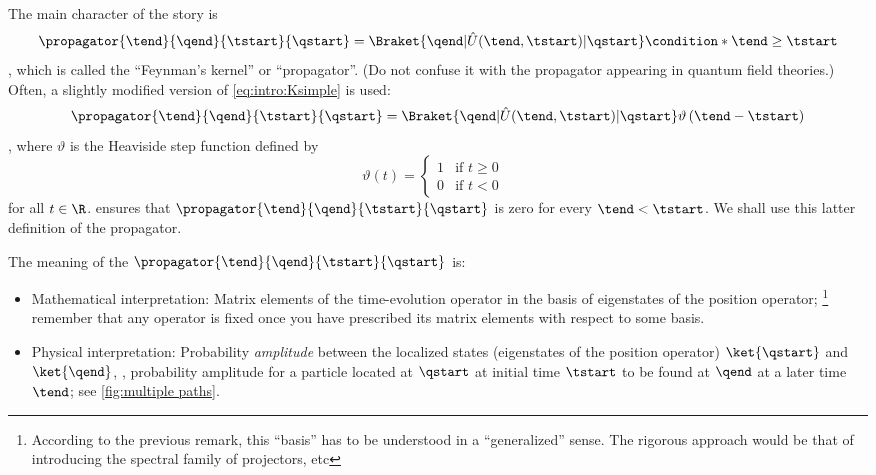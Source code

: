 The   main character of
the story is
\begin{dmath}[label={intro:Ksimple}]
   \propagator{\tend}{\qend}{\tstart}{\qstart} 
   = 
   \Braket{ \qend| \hat{U} (\tend,\tstart) | \qstart}
   \condition*{\tend \geq \tstart}
\end{dmath},
which is called the ``Feynman's kernel'' or ``propagator''. (Do not confuse it
with the propagator appearing in quantum field theories.)
Often, a slightly modified version of \cref{eq:intro:Ksimple} is used:
\begin{dmath}[label={intro:K}]
   \propagator{\tend}{\qend}{\tstart}{\qstart} 
   = 
   \Braket{ \qend| \hat{U} (\tend,\tstart) | \qstart}
   \vartheta\left( \tend -\tstart \right)
\end{dmath},
where $\vartheta$ is the Heaviside step function defined by 
\begin{dmath*}
   \vartheta( t) = 
   \begin{cases}
      1  & \textrm{if $t \geq 0$ }  \\
      0  & \textrm{if $t<0$ }
   \end{cases}
\end{dmath*}
for all $t\in\R$.
 ensures that 
$\propagator{\tend}{\qend}{\tstart}{\qstart}$ is zero for every $\tend <
\tstart$. We shall use this latter definition of the propagator.

The  meaning of the 
$\propagator{\tend}{\qend}{\tstart}{\qstart}$  is:
\begin{itemize}
   \item Mathematical interpretation: Matrix elements of the time-evolution
      operator in the basis of eigenstates of the position operator;%
      \footnote{According to the previous remark, this ``basis'' has to be
	 understood in a ``generalized'' sense. The rigorous approach would be
	 that of introducing the spectral family of projectors, etc}
      remember that any operator is fixed once you have prescribed its matrix
      elements with respect to some basis.
   \item Physical interpretation: Probability \emph{amplitude} 
      between the localized states (eigenstates of the position operator)
      $\ket{\qstart}$ and $\ket{\qend}$, \ie, probability amplitude for a
      particle located at $\qstart$ at initial time $\tstart$ to be found at
      $\qend$ at a later time $\tend$; see \cref{fig:multiple paths}.
\end{itemize}

